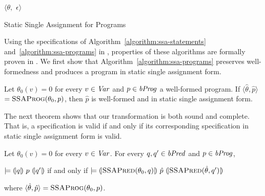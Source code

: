 \begin{algorithm}
  \begin{algorithmic}[1]
      \Case{$\epsilon$}
        \Return $\langle \theta,$ $\epsilon \rangle$
      \EndCase
      \EndCase
    \EndMatch
    \EndFunction
  \end{algorithmic}
  \caption{Static Single Assignment for Programs}
  \label{algorithm:ssa-programs}
\end{algorithm}

Using the specifications of Algorithm~\ref{algorithm:ssa-statements}
and~\ref{algorithm:ssa-programs} in \gallina, properties of these
algorithms are formally proven in \coq. We first show that
Algorithm~\ref{algorithm:ssa-programs} preserves well-formedness and
produces a program in static single assignment form.
\begin{lemma}
  Let $\theta_0(v) = 0$ for every $v \in \mathit{Var}$ and $p \in \mathit{bProg}$ a
  well-formed program. If
  $\langle \hat{\theta}, \hat{p} \rangle$ $=
  \textsc{SSAProg}(\theta_0, p)$, then
  $\hat{p}$ is well-formed and in static single assignment form.
  \label{lemma:ssa-programs}
\end{lemma}

The next theorem shows that our transformation is both sound and
complete. That is, a specification is valid if and only if its
corresponding specification in static single assignment form is valid.
\begin{theorem}
  Let $\theta_0(v) = 0$ for every $v \in \mathit{Var}$. For every $q, q' \in \mathit{bPred}$
  and $p \in \mathit{bProg}$,
  \begin{center}
    $\models {(\!|}{q}{|\!)}~{p}~{(\!|}{q'}{|\!)}$ if and only if
    $\models {(\!|}{\textsc{SSAPred}(\theta_0, q)}{|\!)}~{\hat{p}}~{(\!|}{\textsc{SSAPred}(\hat{\theta}, q')}{|\!)}$
  \end{center}
  where $\langle \hat{\theta}, \hat{p} \rangle =
  \textsc{SSAProg}(\theta_0, p)$.
  \label{theorem:ssa}
\end{theorem}

